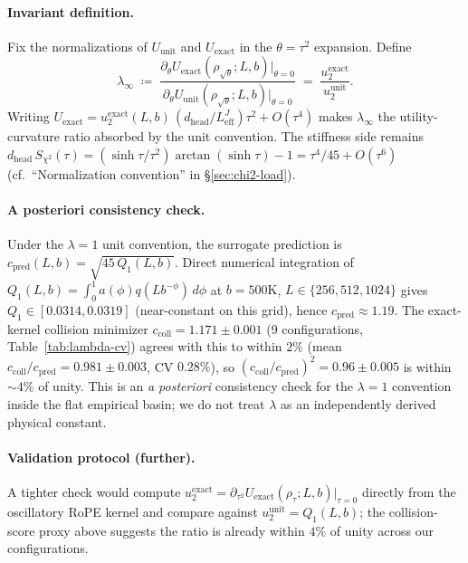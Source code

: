 \paragraph{Invariant definition.} Fix the normalizations of $U_{\mathrm{unit}}$ and $U_{\mathrm{exact}}$ in the $\theta=\tau^2$ expansion. Define
\begin{equation}
\lambda_\infty
\;\coloneqq\;
\frac{\partial_\theta U_{\mathrm{exact}}(\rho_{\sqrt{\theta}};L,b)|_{\theta=0}}
     {\partial_\theta U_{\mathrm{unit}}(\rho_{\sqrt{\theta}};L,b)|_{\theta=0}}
\;=\; \frac{u_2^{\mathrm{exact}}}{u_2^{\mathrm{unit}}}.
\label{eq:lambda-true}
\end{equation}
Writing $U_{\mathrm{exact}}=u_2^{\mathrm{exact}}(L,b)\,(d_{\mathrm{head}}/L_{\mathrm{eff}}^{J})\tau^2 + O(\tau^4)$ makes $\lambda_\infty$ the utility-curvature ratio absorbed by the unit convention. The stiffness side remains $d_{\mathrm{head}}\,S_{\chi^2}(\tau) = (\sinh\tau/\tau^2)\arctan(\sinh\tau) - 1 = \tau^4/45 + O(\tau^6)$ (cf.\ ``Normalization convention'' in \S\ref{sec:chi2-load}).

\paragraph{A posteriori consistency check.} Under the $\lambda{=}1$ unit convention, the surrogate prediction is $c_{\mathrm{pred}}(L,b) = \sqrt{45\,Q_1(L,b)}$. Direct numerical integration of $Q_1(L,b) = \int_0^1 a(\phi) q(Lb^{-\phi})\,d\phi$ at $b{=}500\mathrm{K}$, $L\in\{256,512,1024\}$ gives $Q_1 \in [0.0314, 0.0319]$ (near-constant on this grid), hence $c_{\mathrm{pred}}\approx 1.19$. The exact-kernel collision minimizer $c_{\mathrm{coll}}{=}1.171\pm 0.001$ (9 configurations, Table~\ref{tab:lambda-cv}) agrees with this to within $2\%$ (mean $c_{\mathrm{coll}}/c_{\mathrm{pred}}{=}0.981\pm 0.003$, CV $0.28\%$), so $(c_{\mathrm{coll}}/c_{\mathrm{pred}})^2 = 0.96\pm 0.005$ is within $\sim 4\%$ of unity. This is an \emph{a posteriori} consistency check for the $\lambda{=}1$ convention inside the flat empirical basin; we do not treat $\lambda$ as an independently derived physical constant.

\paragraph{Validation protocol (further).} A tighter check would compute $u_2^{\mathrm{exact}}=\partial_{\tau^2}U_{\mathrm{exact}}(\rho_\tau;L,b)|_{\tau=0}$ directly from the oscillatory RoPE kernel and compare against $u_2^{\mathrm{unit}}=Q_1(L,b)$; the collision-score proxy above suggests the ratio is already within $4\%$ of unity across our configurations.


